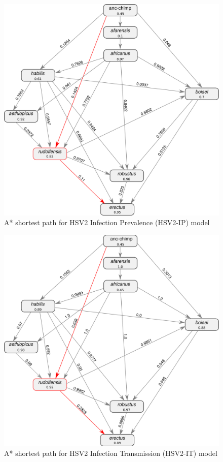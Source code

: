 \documentclass[fleqn,10pt]{wlscirep}
\begin{document}
\begin{figure}
  \centering
  \includegraphics[width=\textwidth]{figs/dag-ip}
  \caption{A* shortest path for HSV2 Infection Prevalence (HSV2-IP) model}
  \label{fig:dag-ip}   
\end{figure}  

\begin{figure}
  \centering
  \includegraphics[width=\textwidth]{figs/dag-it}
  \caption{A* shortest path for HSV2 Infection Transmission (HSV2-IT) model}
  \label{fig:dag-it}   
\end{figure}     
\end{document}
